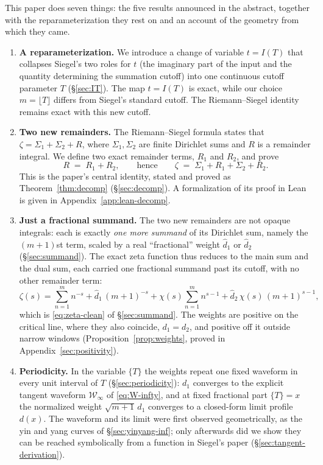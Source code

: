 \documentclass[11pt]{article}
\theoremstyle{definition}
\begin{document}
This paper does seven things: the five results announced in the
abstract, together with the reparameterization they rest on and an
account of the geometry from which they came.

\begin{enumerate}
\item \textbf{A reparameterization.} We introduce a change of variable
$t=I(T)$ that collapses Siegel's two roles for $t$ (the imaginary part of the
input and the quantity determining the summation cutoff) into one continuous
cutoff parameter $T$ (\S\ref{sec:IT}). The map $t=I(T)$ is exact, while our
choice $m=\lfloor T\rfloor$ differs from Siegel's standard cutoff. The
Riemann--Siegel identity remains exact with this new cutoff.

\item \textbf{Two new remainders.} The Riemann--Siegel formula
states that
$\zeta = \Sigma_1 + \Sigma_2 + R$, where $\Sigma_1,\Sigma_2$ are finite Dirichlet
sums and $R$ is a remainder integral. We define two exact
remainder terms,
$R_{1}$ and $R_{2}$, and prove
\[
R \;=\; R_{1} + R_{2},
\qquad\text{hence}\qquad
\zeta \;=\; \Sigma_{1} + R_{1} + \Sigma_{2} + R_{2}.
\]
This is the paper's central identity, stated and proved as
Theorem~\ref{thm:decomp} (\S\ref{sec:decomp}). A formalization of its proof
in Lean is given in Appendix~\ref{app:lean-decomp}.

\item \textbf{Just a fractional summand.} The two new remainders are not
opaque integrals: each is exactly \emph{one more summand} of its Dirichlet
sum, namely the $(m+1)$st term, scaled by a real ``fractional'' weight
$\hat d_1$ or $\hat d_2$ (\S\ref{sec:summand}). The exact zeta function
thus reduces to the main sum and the dual sum, each carried one fractional
summand past its cutoff, with no other remainder term:
\[
\zeta(s)=\sum_{n=1}^{m} n^{-s} + \hat d_1\,(m+1)^{-s}
        + \chi(s)\sum_{n=1}^{m} n^{s-1} + \hat d_2\,\chi(s)\,(m+1)^{s-1},
\]
which is \eqref{eq:zeta-clean} of \S\ref{sec:summand}. The weights are
positive on the critical line, where they also coincide, $d_1=d_2$, and
positive off it outside narrow windows (Proposition~\ref{prop:weights},
proved in Appendix~\ref{sec:positivity}).

\item \textbf{Periodicity.} In the variable $\{T\}$ the weights repeat one
fixed waveform in every unit interval of $T$ (\S\ref{sec:periodicity}):
$d_1$ converges to the explicit tangent waveform $\mathcal W_{\infty}$ of
\eqref{eq:W-infty}, and at fixed fractional part $\{T\}=x$ the normalized
weight $\sqrt{m+1}\,d_1$ converges to a closed-form limit profile $d(x)$.
The waveform and its limit were first observed geometrically, as the yin
and yang curves of \S\ref{sec:yinyang-inf}; only afterwards did we show
they can be reached symbolically from a function in Siegel's paper
(\S\ref{sec:tangent-derivation}).


\end{enumerate}
\end{document}
